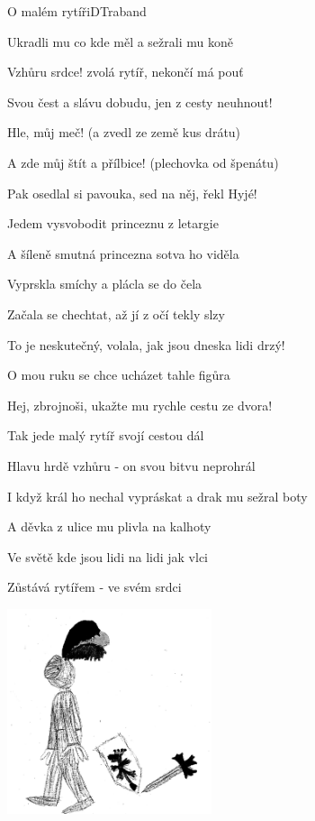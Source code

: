 \begin{song}{O malém rytíři}{D}{Traband}
\begin{SBVerse}
Ukradli mu co kde měl a sežrali mu koně

\end{SBVerse}

\begin{SBVerse}

Vzhůru srdce! zvolá rytíř, nekončí má pouť

Svou čest a slávu dobudu, jen z cesty neuhnout!

Hle, můj meč! (a zvedl ze země kus drátu)

A zde můj štít a přílbice! (plechovka od špenátu)

Pak osedlal si pavouka, sed na něj, řekl Hyjé!

Jedem vysvobodit princeznu z letargie

\end{SBVerse}

\begin{SBVerse}

A šíleně smutná princezna sotva ho viděla

Vyprskla smíchy a plácla se do čela

Začala se chechtat, až jí z očí tekly slzy

To je neskutečný, volala, jak jsou dneska lidi drzý!

O mou ruku se chce ucházet tahle figůra

Hej, zbrojnoši, ukažte mu rychle cestu ze dvora!

\end{SBVerse}

\begin{SBVerse}

Tak jede malý rytíř svojí cestou dál

Hlavu hrdě vzhůru - on svou bitvu neprohrál

I když král ho nechal vypráskat a drak mu sežral boty

A děvka z ulice mu plivla na kalhoty

Ve světě kde jsou lidi na lidi jak vlci

Zůstává rytířem - ve svém srdci

\end{SBVerse}
\begin{center}
\includegraphics[width=6cm]{pict/asi-rytíř.jpg}
\end{center}
\end{song}

\pagebreak